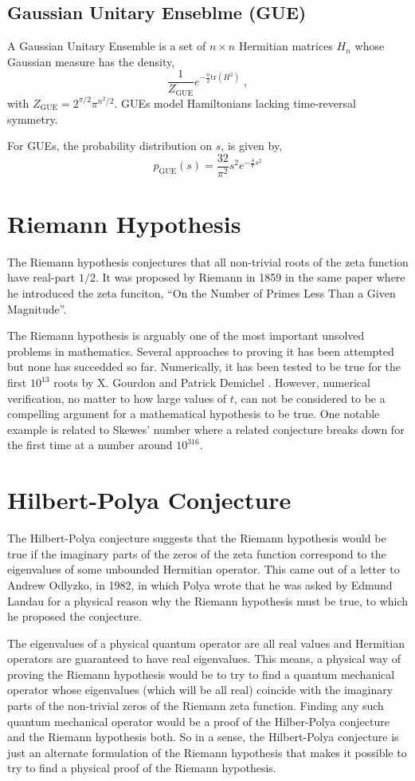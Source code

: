 \documentclass{amsproc}
\theoremstyle{definition}
\theoremstyle{remark}
\numberwithin{equation}{section}
\begin{document}
\subsection{Gaussian Unitary Enseblme (GUE)}
A Gaussian Unitary Ensemble is a set of $n \times n$ Hermitian matrices $H_n$ whose Gaussian measure has the density, 
$$
\frac{1}{Z_{\mathrm{GUE}}} e^{ - \frac{n}{2} \mathrm{tr}(H^2) } \;,
$$
with $Z_{\mathrm{GUE}} = 2^{ \pi / 2} \pi^{n^2 / 2}$. GUEs model Hamiltonians lacking time-reversal symmetry. 

For GUEs, the probability distribution on $s$, is given by, 
$$
p_{\mathrm{GUE}}(s) = \frac{32}{\pi^2} s^2 e^{- \frac{4}{\pi} s^2 }
$$

\section{Riemann Hypothesis}
The Riemann hypothesis conjectures that all non-trivial roots of the zeta function have real-part $1/2$. It was proposed by Riemann in 1859 in the same paper where he introduced the zeta funciton, ``On the Number of Primes Less Than a Given Magnitude''.

The Riemann hypothesis is arguably one of the most important unsolved problems in mathematics. Several approaches to proving it has been attempted but none has succedded so far. Numerically, it has been tested to be true for the first $10^{13}$ roots by X. Gourdon and Patrick Demichel \cite{}. However, numerical verification, no matter to how large values of $t$, can not be considered to be a compelling argument for a mathematical hypothesis to be true. One notable example is related to Skewes' number where a related conjecture breaks down for the first time at a number around $10^{316}$. 

\section{Hilbert-Polya Conjecture}
The Hilbert-Polya conjecture suggests that the Riemann hypothesis would be true if the imaginary parts of the zeros of the zeta function correspond to the eigenvalues of some unbounded Hermitian operator. This came out of a letter to Andrew Odlyzko, in 1982, in which Polya wrote that he was asked by Edmund Landau for a physical reason why the Riemann hypothesis must be true, to which he proposed the conjecture. 

The eigenvalues of a physical quantum operator are all real values and Hermitian operators are guaranteed to have real eigenvalues. This means, a physical way of proving the Riemann hypothesis would be to try to find a quantum mechanical operator whose eigenvalues (which will be all real) coincide with the imaginary parts of the non-trivial zeros of the Riemann zeta function. Finding any such quantum mechanical operator would be a proof of the Hilber-Polya conjecture and the Riemann hypothesis both. So in a sense, the Hilbert-Polya conjecture is just an alternate formulation of the Riemann hypothesis that makes it possible to try to find a physical proof of the Riemann hypothesis. 
\end{document}
